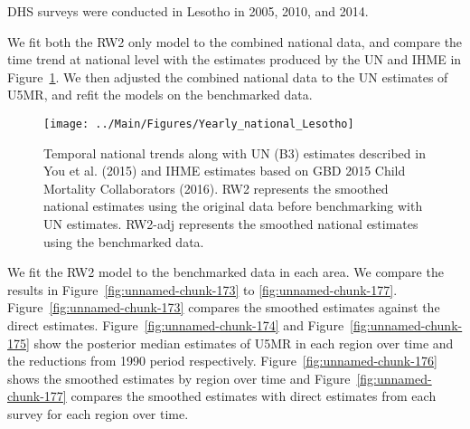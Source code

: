 \documentclass[12pt]{article}\usepackage[]{graphicx}\usepackage[]{color}
\newenvironment{knitrout}{}{} %
\begin{document}


DHS surveys were conducted in Lesotho in 2005, 2010, and 2014.

We fit both the RW2 only model to the combined national data, and compare the time trend at national level with the estimates produced by the UN and IHME in Figure~\ref{fig:unnamed-chunk-172}. We then adjusted the combined national data to the UN estimates of U5MR, and refit the models on the benchmarked data. 

\begin{knitrout}
\color{fgcolor}\begin{figure}[bht]

{\centering \texttt{[image: ../Main/Figures/Yearly\_national\_Lesotho]} 

}

\caption[Temporal national trends along with UN (B3) estimates described in You et al]{Temporal national trends along with UN (B3) estimates described in You et al. (2015) and IHME estimates based on GBD 2015 Child Mortality Collaborators (2016). RW2 represents the smoothed national estimates using the original data before benchmarking with UN estimates. RW2-adj represents the smoothed national estimates using the benchmarked data.}\label{fig:unnamed-chunk-172}
\end{figure}


\end{knitrout}
 

We fit the RW2 model to the benchmarked data in each area. 
We compare the results in Figure~\ref{fig:unnamed-chunk-173} to \ref{fig:unnamed-chunk-177}.
Figure~\ref{fig:unnamed-chunk-173} compares the smoothed estimates against the direct estimates. Figure~\ref{fig:unnamed-chunk-174} and Figure~\ref{fig:unnamed-chunk-175} show the posterior median estimates of U5MR in each region over time and the reductions from 1990 period respectively.
Figure~\ref{fig:unnamed-chunk-176} shows the smoothed estimates by region over time and Figure~\ref{fig:unnamed-chunk-177} compares the smoothed estimates with direct estimates from each survey for each region over time.


\end{document}
